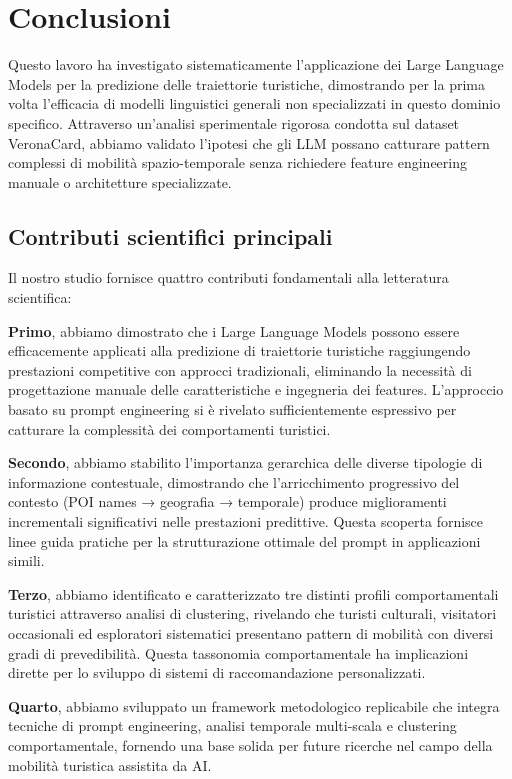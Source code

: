 \section{Conclusioni}

Questo lavoro ha investigato sistematicamente l'applicazione dei Large Language Models per la predizione delle traiettorie turistiche, dimostrando per la prima volta l'efficacia di modelli linguistici generali non specializzati in questo dominio specifico. Attraverso un'analisi sperimentale rigorosa condotta sul dataset VeronaCard, abbiamo validato l'ipotesi che gli LLM possano catturare pattern complessi di mobilità spazio-temporale senza richiedere feature engineering manuale o architetture specializzate.

\subsection{Contributi scientifici principali}

Il nostro studio fornisce quattro contributi fondamentali alla letteratura scientifica:

\textbf{Primo}, abbiamo dimostrato che i Large Language Models possono essere efficacemente applicati alla predizione di traiettorie turistiche raggiungendo prestazioni competitive con approcci tradizionali, eliminando la necessità di progettazione manuale delle caratteristiche e ingegneria dei features. L'approccio basato su prompt engineering si è rivelato sufficientemente espressivo per catturare la complessità dei comportamenti turistici.

\textbf{Secondo}, abbiamo stabilito l'importanza gerarchica delle diverse tipologie di informazione contestuale, dimostrando che l'arricchimento progressivo del contesto (POI names → geografia → temporale) produce miglioramenti incrementali significativi nelle prestazioni predittive. Questa scoperta fornisce linee guida pratiche per la strutturazione ottimale del prompt in applicazioni simili.

\textbf{Terzo}, abbiamo identificato e caratterizzato tre distinti profili comportamentali turistici attraverso analisi di clustering, rivelando che turisti culturali, visitatori occasionali ed esploratori sistematici presentano pattern di mobilità con diversi gradi di prevedibilità. Questa tassonomia comportamentale ha implicazioni dirette per lo sviluppo di sistemi di raccomandazione personalizzati.

\textbf{Quarto}, abbiamo sviluppato un framework metodologico replicabile che integra tecniche di prompt engineering, analisi temporale multi-scala e clustering comportamentale, fornendo una base solida per future ricerche nel campo della mobilità turistica assistita da AI.


